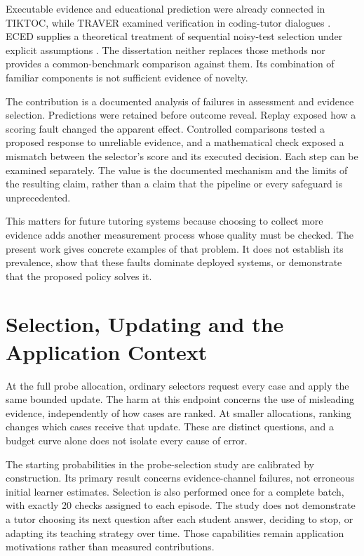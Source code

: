 Executable evidence and educational prediction were already connected in TIKTOC, while TRAVER examined verification in
coding-tutor dialogues \parencite{duan2025tiktoc,wang2025traver}. ECED supplies a theoretical treatment of sequential noisy-test
selection under explicit assumptions \parencite{chen2017noisy}. The dissertation neither replaces those methods nor provides
a common-benchmark comparison against them. Its combination of familiar components is not sufficient evidence of novelty.

The contribution is a documented analysis of failures in assessment and evidence selection. Predictions were retained before outcome reveal. Replay
exposed how a scoring fault changed the apparent effect. Controlled comparisons tested a proposed response to unreliable
evidence, and a mathematical check exposed a mismatch between the selector's score and its executed decision. Each step can
be examined separately. The value is the documented mechanism and the limits of the resulting claim, rather than a claim
that the pipeline or every safeguard is unprecedented.

This matters for future tutoring systems because choosing to collect more evidence adds another measurement process whose
quality must be checked. The present work gives concrete examples of that problem. It does not establish its prevalence,
show that these faults dominate deployed systems, or demonstrate that the proposed policy solves it.

\section{Selection, Updating and the Application Context}

At the full probe allocation, ordinary selectors request every case and apply the same bounded update. The harm at this
endpoint concerns the use of misleading evidence, independently of how cases are ranked. At smaller allocations, ranking
changes which cases receive that update. These are distinct questions, and a budget curve alone does not isolate every cause
of error.

The starting probabilities in the probe-selection study are calibrated by construction. Its primary result concerns evidence-channel failures,
not erroneous initial learner estimates. Selection is also performed once for a complete batch, with exactly 20 checks assigned
to each episode. The study does not demonstrate a tutor choosing its next question after each student answer, deciding to stop,
or adapting its teaching strategy over time.
Those capabilities remain application motivations rather than measured contributions.

